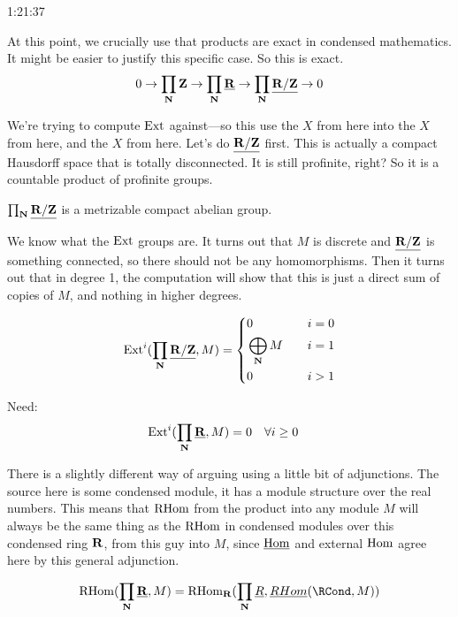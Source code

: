 \begin{unfinished}{1:21:37}
\begin{sketch}
At this point, we crucially use that products are exact in condensed mathematics. It might be easier to justify this specific case. So this is exact.
\begin{align*}
0 \to \prod_\mathbf N \mathbf Z \to \prod_\mathbf N \underline{\mathbf R} \to \prod_\mathbf N \underline{\mathbf R / \mathbf Z} \to 0
\end{align*}

We're trying to compute $\operatorname{Ext}$ against---so this use the $X$ from here into the $X$ from here, and the $X$ from here. Let's do $\underline{\mathbf R / \mathbf Z}$ first. This is actually a compact Hausdorff space that is totally disconnected. It is still profinite, right? So it is a countable product of profinite groups. 

$ \prod_\mathbf N \underline{\mathbf R / \mathbf Z} $ is a metrizable compact abelian group.

We know what the $\operatorname{Ext}$ groups are. It turns out that $M$ is discrete and $\underline{\mathbf R / \mathbf Z}$ is something connected, so there should not be any homomorphisms. Then it turns out that in degree 1, the computation will show that this is just a direct sum of copies of $M$, and nothing in higher degrees.

\begin{align*}
\operatorname{Ext}^i(\prod_\mathbf N \underline{\mathbf R / \mathbf Z}, M) = 
\left\{
    \begin {aligned}
		& 0 \quad & i = 0 \\
        & \bigoplus_\mathbf N M \quad & i = 1 \\
        & 0 \quad & i > 1                  
    \end{aligned}
\right.
\end{align*}

Need: 
\begin{align*}
\operatorname{Ext}^i(\prod_\mathbf N \underline{\mathbf R}, M) = 0 \quad & \forall i \geq 0
\end{align*}


There is a slightly different way of arguing using a little bit of adjunctions. The source here is some condensed module, it has a module structure over the real numbers. This means that $\operatorname{RHom}$ from the product into any module $M$ will always be the same thing as the $\operatorname{RHom}$ in condensed modules over this condensed ring $\mathbf R$, from this guy into $M$, since $\operatorname{\underline{Hom}}$ and external $\operatorname{Hom}$ agree here by this general adjunction.

\begin{align*}
\RHom(\prod_\N \Rcond, M) = \RHom_\R (\prod_\N \underline{R}, \underline{RHom}(\RCond, M))
\end{align*}



\end{sketch}
\end{unfinished}
